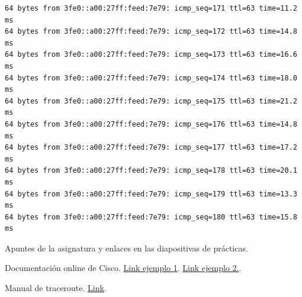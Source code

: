 \documentclass{article}
\begin{document}
\begin{Verbatim}
64 bytes from 3fe0::a00:27ff:feed:7e79: icmp_seq=171 ttl=63 time=11.2 ms
64 bytes from 3fe0::a00:27ff:feed:7e79: icmp_seq=172 ttl=63 time=14.8 ms
64 bytes from 3fe0::a00:27ff:feed:7e79: icmp_seq=173 ttl=63 time=16.6 ms
64 bytes from 3fe0::a00:27ff:feed:7e79: icmp_seq=174 ttl=63 time=18.0 ms
64 bytes from 3fe0::a00:27ff:feed:7e79: icmp_seq=175 ttl=63 time=21.2 ms
64 bytes from 3fe0::a00:27ff:feed:7e79: icmp_seq=176 ttl=63 time=14.8 ms
64 bytes from 3fe0::a00:27ff:feed:7e79: icmp_seq=177 ttl=63 time=17.2 ms
64 bytes from 3fe0::a00:27ff:feed:7e79: icmp_seq=178 ttl=63 time=20.1 ms
64 bytes from 3fe0::a00:27ff:feed:7e79: icmp_seq=179 ttl=63 time=13.3 ms
64 bytes from 3fe0::a00:27ff:feed:7e79: icmp_seq=180 ttl=63 time=15.8 ms
\end{Verbatim}



\begin{thebibliography}{99}
	Apuntes de la asignatura y enlaces en las diapositivas de prácticas.
	
	Documentación online de Cisco. \hyperref{http://www.cisco.com/c/en/us/support/docs/ip/ip-routed-protocols/112228-bgp2isp-00.html}{}{}{Link ejemplo 1}. \hyperref{http://www.cisco.com/c/en/us/td/docs/ios/ipv6/command/reference/ipv6_book/ipv6_12.html}{}{}{Link ejemplo 2.}.
	
	Manual de traceroute. \hyperref{http://linux.die.net/man/8/traceroute6}{}{}{Link}.

\end{thebibliography}
\end{document}
